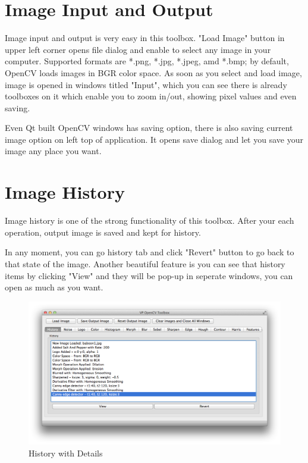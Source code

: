 \documentclass{article}
\begin{document}
\section{Image Input and Output}

	Image input and output is very easy in this toolbox. "Load Image" button in upper left corner opens file dialog and enable to select any image in your computer. Supported formats are *.png, *.jpg, *.jpeg, amd *.bmp; by default, OpenCV loads images in BGR color space. As soon as you select and load image, image is opened in windows titled "Input", which you can see there is already toolboxes on it which enable you to zoom in/out, showing pixel values and even saving. \par
	Even Qt built OpenCV windows has saving option, there is also saving current image option on left top of application. It opens save dialog and let you save your image any place you want.

\section{Image History}
	Image history is one of the strong functionality of this toolbox. After your each operation, output image is saved and kept for history. \par
	In any moment, you can go history tab and click "Revert" button to go back to that state of the image. Another beautiful feature is  you can see that history items by clicking "View" and they will be pop-up in seperate windows, you can open as much as you want.
	
\begin{figure}[H]
\begin{center}
\includegraphics[scale=0.42]{toolboxHistory.png}
\caption{History with Details}
\end{center}
\end{figure}	
\end{document}
